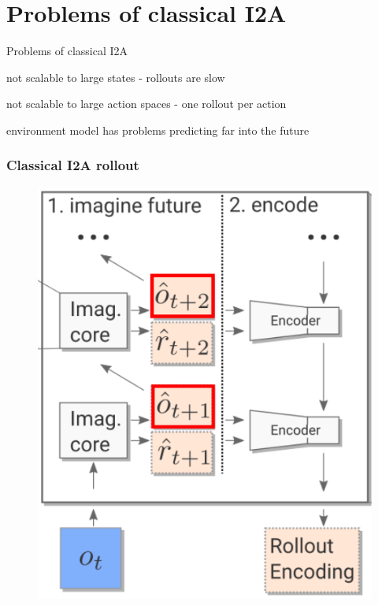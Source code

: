 
\section{Problems of classical I2A}
\begin{frame}{Problems of classical I2A}
    \begin{PraesentationAufzaehlung}
        \item not scalable to large states - rollouts are slow
        \item not scalable to large action spaces - one rollout per action
        \item environment model has problems predicting far into the future
    \end{PraesentationAufzaehlung}
\end{frame}

\begin{frame}
	\frametitle{Classical I2A rollout}
	\begin{figure}[h]
		\centering
		\includegraphics[height=0.7\textheight]{./latent_i2a_images/SingleImaginationRollout_marked.png}
	\end{figure}
\end{frame}

